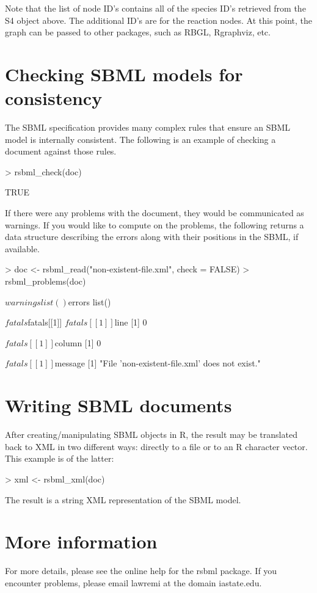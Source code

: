 \documentclass[english]{article}
\begin{document}
Note that the list of node ID's contains all of the species ID's retrieved from
the S4 object above. The additional ID's are for the reaction nodes.
At this point, the graph can be passed to other packages, such as RBGL, Rgraphviz, etc.

\section*{Checking SBML models for consistency}\label{checking}
The SBML specification provides many complex rules that ensure an SBML model
is internally consistent. The following is an example of checking a document
against those rules.

\begin{Schunk}
\begin{Sinput}
> rsbml_check(doc)
\end{Sinput}
\begin{Soutput}
[1] TRUE
\end{Soutput}
\end{Schunk}

If there were any problems with the document, they would be communicated as
warnings. If you would like to compute on the problems, the following returns
a data structure describing the errors along with their positions in the SBML,
if available.

\begin{Schunk}
\begin{Sinput}
> doc <- rsbml_read("non-existent-file.xml", check = FALSE)
> rsbml_problems(doc)
\end{Sinput}
\begin{Soutput}
$warnings
list()

$errors
list()

$fatals
$fatals[[1]]
$fatals[[1]]$line
[1] 0

$fatals[[1]]$column
[1] 0

$fatals[[1]]$message
[1] "File 'non-existent-file.xml' does not exist."
\end{Soutput}
\end{Schunk}

\section*{Writing SBML documents}
After creating/manipulating SBML objects in R, the result may be translated
back to XML in two different ways: directly to a file or to an R character vector.
This example is of the latter:

\begin{Schunk}
\begin{Sinput}
> xml <- rsbml_xml(doc)
\end{Sinput}
\end{Schunk}

The result is a string XML representation of the SBML model.

\section*{More information}
For more details, please see the online help for the rsbml package. If you
encounter problems, please email lawremi at the domain iastate.edu.
\end{document}
